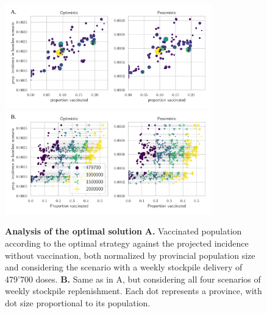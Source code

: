 \begin{figure}[!ht]
\centering
\includegraphics[width=0.8\textwidth]{fig_italy-ocp/figures/scatter_top.pdf}
\includegraphics[width=0.8\textwidth]{fig_italy-ocp/figures/scatter_scn.pdf}
\caption[Analysis of the optimal solution]{\textbf{Analysis of the optimal solution} \textbf{A.} Vaccinated population according to the optimal strategy against the projected incidence without vaccination, both normalized by provincial population size and considering the scenario with a weekly stockpile delivery of 479'700 doses. \textbf{B.} Same as in A, but considering all four scenarios of weekly stockpile replenishment. Each dot represents a province, with dot size proportional to its population.}
    \label{fig:OC_scatter}
\end{figure}


